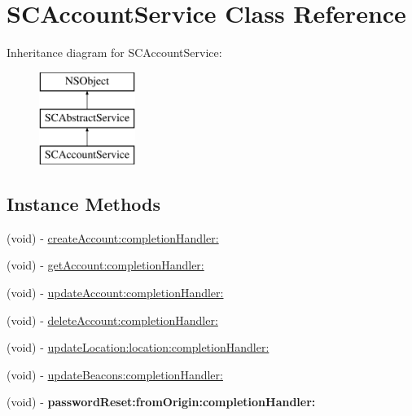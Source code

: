 \hypertarget{interface_s_c_account_service}{}\section{S\+C\+Account\+Service Class Reference}
\label{interface_s_c_account_service}
Inheritance diagram for S\+C\+Account\+Service\+:\begin{figure}[H]
\begin{center}
\leavevmode
\includegraphics[height=3.000000cm]{interface_s_c_account_service}
\end{center}
\end{figure}
\subsection*{Instance Methods}
\begin{DoxyCompactItemize}
\item 
(void) -\/ \hyperlink{interface_s_c_account_service_a55e6e13b199a5b6fbf04e9e28f61302a}{create\+Account\+:completion\+Handler\+:}
\item 
(void) -\/ \hyperlink{interface_s_c_account_service_a1a773fd02110bc3b358a8028a3b7b38b}{get\+Account\+:completion\+Handler\+:}
\item 
(void) -\/ \hyperlink{interface_s_c_account_service_a160287f1a6812bba589c76fdedfa7327}{update\+Account\+:completion\+Handler\+:}
\item 
(void) -\/ \hyperlink{interface_s_c_account_service_a761ac12868562526f0e8f592a2a3834b}{delete\+Account\+:completion\+Handler\+:}
\item 
(void) -\/ \hyperlink{interface_s_c_account_service_a5acb4a7e22d4efbfa5c725ebdc110fcc}{update\+Location\+:location\+:completion\+Handler\+:}
\item 
(void) -\/ \hyperlink{interface_s_c_account_service_acd6973d04dfb660c6c231766108c8240}{update\+Beacons\+:completion\+Handler\+:}
\item 
(void) -\/ {\bfseries password\+Reset\+:from\+Origin\+:completion\+Handler\+:}\hypertarget{interface_s_c_account_service_a1f2c7b0e4e1e4af5026ac95104d2e7cb}{}\label{interface_s_c_account_service_a1f2c7b0e4e1e4af5026ac95104d2e7cb}

\end{DoxyCompactItemize}
